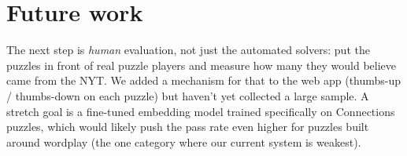 \documentclass[11pt, letterpaper]{article}
\begin{document}
\section*{Future work}

The next step is \emph{human} evaluation, not just the automated solvers: put
the puzzles in front of real puzzle players and measure how many they would
believe came from the NYT. We added a mechanism for that to the web app
(thumbs-up / thumbs-down on each puzzle) but haven't yet collected a large
sample. A stretch goal is a fine-tuned embedding model trained specifically on
Connections puzzles, which would likely push the pass rate even higher for
puzzles built around wordplay (the one category where our current system is
weakest).
\end{document}

